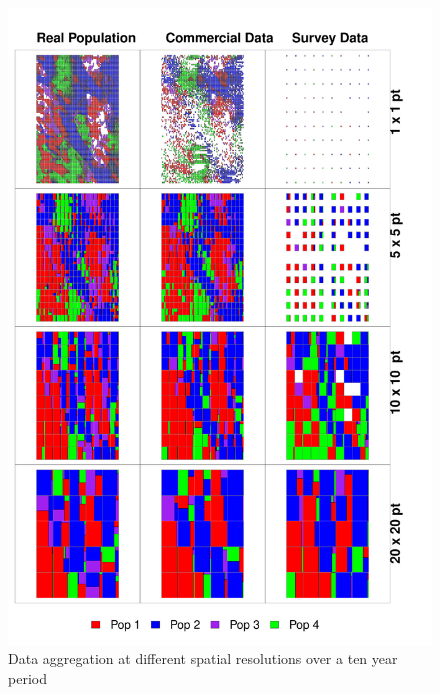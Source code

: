 \documentclass[review]{elsarticle}
\begin{document}
\begin{figure}[!ht]
	\includegraphics[width =\linewidth]{../analysis/Data_Aggregation_space}
	\caption{Data aggregation at different spatial resolutions over a
		ten year period}
	\label{fig:1}
\end{figure}	
\end{document}
